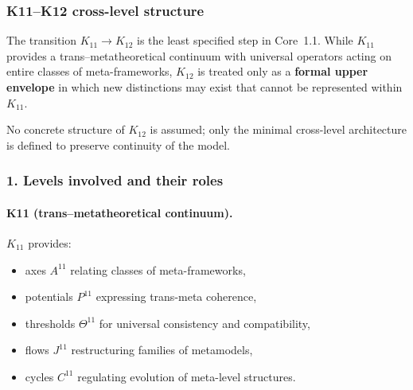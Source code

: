 
\subsubsection{K11–K12 cross-level structure}
\label{sec:crossk-k11-k12}

The transition $K_{11} \rightarrow K_{12}$ is the least specified step in
Core~1.1. While $K_{11}$ provides a trans–metatheoretical continuum with
universal operators acting on entire classes of meta-frameworks, $K_{12}$
is treated only as a \textbf{formal upper envelope} in which new
distinctions may exist that cannot be represented within $K_{11}$.

No concrete structure of $K_{12}$ is assumed; only the minimal
cross-level architecture is defined to preserve continuity of the model.

\subsubsection{1. Levels involved and their roles}

\paragraph{K11 (trans–metatheoretical continuum).}
$K_{11}$ provides:
\begin{itemize}
  \item axes $A^{11}$ relating classes of meta-frameworks,
  \item potentials $P^{11}$ expressing trans-meta coherence,
  \item thresholds $\Theta^{11}$ for universal consistency and compatibility,
  \item flows $J^{11}$ restructuring families of metamodels,
  \item cycles $C^{11}$ regulating evolution of meta-level structures.
\end{itemize}


